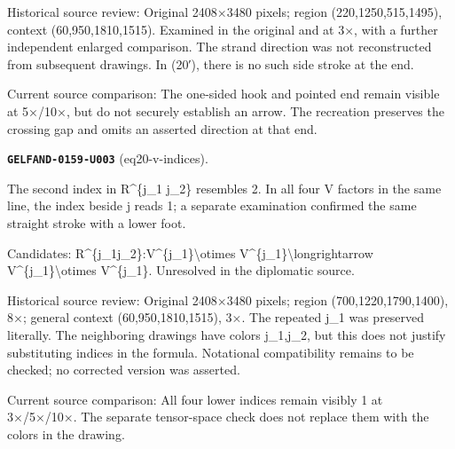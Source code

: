 Historical source review: Original 2408×3480 pixels; region (220,1250,515,1495), context (60,950,1810,1515). Examined in the original and at 3×, with a further independent enlarged comparison. The strand direction was not reconstructed from subsequent drawings. In (20′), there is no such side stroke at the end.\par
Current source comparison: The one-sided hook and pointed end remain visible at 5×/10×, but do not securely establish an arrow. The recreation preserves the crossing gap and omits an asserted direction at that end.\par\medskip
\par\noindent\leavevmode{}\label{GELFAND-0159-U003}\label{GELFAND-P001465:eq20-v-indices}\textbf{\texttt{GELFAND-0159-U003}} (eq20-v-indices).\nopagebreak[4]\par
The second index in R\textasciicircum{}\{j\_1 j\_2\} resembles 2. In all four V factors in the same line, the index beside j reads 1; a separate examination confirmed the same straight stroke with a lower foot.\par
Candidates: R\textasciicircum{}\{j\_1j\_2\}:V\textasciicircum{}\{j\_1\}\textbackslash{}otimes V\textasciicircum{}\{j\_1\}\textbackslash{}longrightarrow V\textasciicircum{}\{j\_1\}\textbackslash{}otimes V\textasciicircum{}\{j\_1\}. Unresolved in the diplomatic source.\par
Historical source review: Original 2408×3480 pixels; region (700,1220,1790,1400), 8×; general context (60,950,1810,1515), 3×. The repeated j\_1 was preserved literally. The neighboring drawings have colors j\_1,j\_2, but this does not justify substituting indices in the formula. Notational compatibility remains to be checked; no corrected version was asserted.\par
Current source comparison: All four lower indices remain visibly 1 at 3×/5×/10×. The separate tensor-space check does not replace them with the colors in the drawing.\par\medskip
